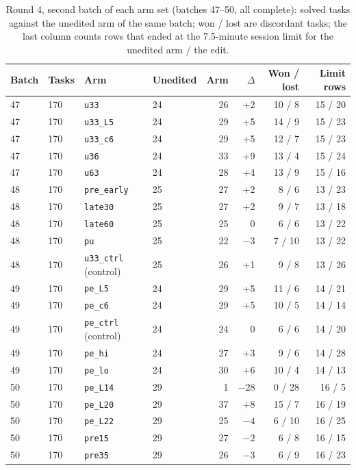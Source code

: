 \begin{table}[h]
\caption{Round 4, second batch of each arm set (batches 47--50, all complete): solved tasks against the unedited arm of the same batch; won / lost are discordant tasks; the last column counts rows that ended at the 7.5-minute session limit for the unedited arm / the edit.}
\label{tab:round4b}
\centering
\small
\begin{tabular}{llllrrrr}
\toprule
Batch & Tasks & Arm & Unedited & Arm & $\Delta$ & Won / lost & Limit rows \\
\midrule
47 & 170 & \texttt{u33} & 24 & 26 & +2 & 10 / 8 & 15 / 20 \\
47 & 170 & \texttt{u33\_L5} & 24 & 29 & +5 & 14 / 9 & 15 / 23 \\
47 & 170 & \texttt{u33\_c6} & 24 & 29 & +5 & 12 / 7 & 15 / 23 \\
47 & 170 & \texttt{u36} & 24 & 33 & +9 & 13 / 4 & 15 / 24 \\
47 & 170 & \texttt{u63} & 24 & 28 & +4 & 13 / 9 & 15 / 16 \\
\midrule
48 & 170 & \texttt{pre\_early} & 25 & 27 & +2 & 8 / 6 & 13 / 23 \\
48 & 170 & \texttt{late30} & 25 & 27 & +2 & 9 / 7 & 13 / 18 \\
48 & 170 & \texttt{late60} & 25 & 25 & 0 & 6 / 6 & 13 / 22 \\
48 & 170 & \texttt{pu} & 25 & 22 & $-3$ & 7 / 10 & 13 / 22 \\
48 & 170 & \texttt{u33\_ctrl} (control) & 25 & 26 & +1 & 9 / 8 & 13 / 26 \\
\midrule
49 & 170 & \texttt{pe\_L5} & 24 & 29 & +5 & 11 / 6 & 14 / 21 \\
49 & 170 & \texttt{pe\_c6} & 24 & 29 & +5 & 10 / 5 & 14 / 14 \\
49 & 170 & \texttt{pe\_ctrl} (control) & 24 & 24 & 0 & 6 / 6 & 14 / 20 \\
49 & 170 & \texttt{pe\_hi} & 24 & 27 & +3 & 9 / 6 & 14 / 28 \\
49 & 170 & \texttt{pe\_lo} & 24 & 30 & +6 & 10 / 4 & 14 / 13 \\
\midrule
50 & 170 & \texttt{pe\_L14} & 29 & 1 & $-28$ & 0 / 28 & 16 / 5 \\
50 & 170 & \texttt{pe\_L20} & 29 & 37 & +8 & 15 / 7 & 16 / 19 \\
50 & 170 & \texttt{pe\_L22} & 29 & 25 & $-4$ & 6 / 10 & 16 / 25 \\
50 & 170 & \texttt{pre15} & 29 & 27 & $-2$ & 6 / 8 & 16 / 15 \\
50 & 170 & \texttt{pre35} & 29 & 26 & $-3$ & 6 / 9 & 16 / 23 \\
\bottomrule
\end{tabular}
\end{table}

